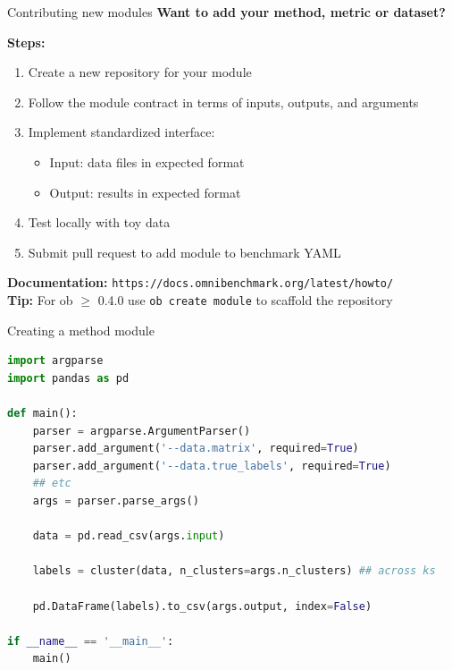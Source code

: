 \documentclass[aspectratio=169]{beamer}
\begin{document}
\begin{frame}{Contributing new modules}
    \textbf{Want to add your method, metric or dataset?}
    
    \vspace{0.3cm}
    \textbf{Steps:}
    \begin{enumerate}
        \item Create a new repository for your module
        \item Follow the module contract in terms of inputs, outputs, and arguments
        \item Implement standardized interface:
            \begin{itemize}
                \item Input: data files in expected format
                \item Output: results in expected format
            \end{itemize}
        \item Test locally with toy data
        \item Submit pull request to add module to benchmark YAML
    \end{enumerate}
    
    \vspace{0.3cm}
    \textbf{Documentation:} \texttt{https://docs.omnibenchmark.org/latest/howto/} \\
    \vspace{0.3cm}
    \textbf{Tip:} For ob $\ge$ 0.4.0 use \texttt{ob create module} to scaffold the repository
    
\end{frame}

\begin{frame}[fragile]{Creating a method module}
\begin{lstlisting}[language=python]
import argparse
import pandas as pd

def main():
    parser = argparse.ArgumentParser()
    parser.add_argument('--data.matrix', required=True)
    parser.add_argument('--data.true_labels', required=True)
    ## etc
    args = parser.parse_args()    

    data = pd.read_csv(args.input)

    labels = cluster(data, n_clusters=args.n_clusters) ## across ks
    
    pd.DataFrame(labels).to_csv(args.output, index=False)

if __name__ == '__main__':
    main()
\end{lstlisting}
\end{frame}
\end{document}
